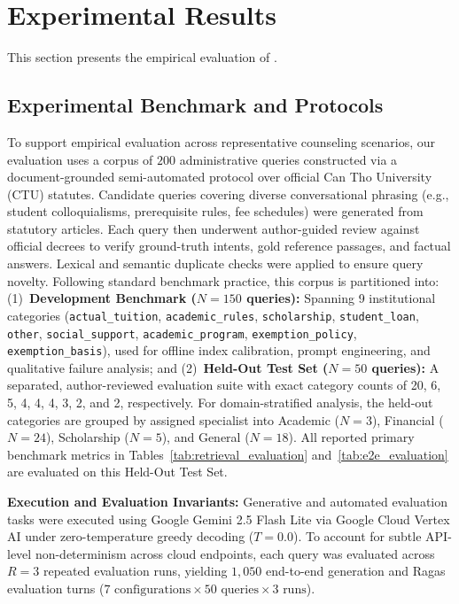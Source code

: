 \section{Experimental Results}
\label{sec:exp}

This section presents the empirical evaluation of \system{}.

\subsection{Experimental Benchmark and Protocols}
\label{sec:dataset}

To support empirical evaluation across representative counseling scenarios, our evaluation uses a corpus of $200$ administrative queries constructed via a document-grounded semi-automated protocol over official Can Tho University (CTU) statutes. Candidate queries covering diverse conversational phrasing (e.g., student colloquialisms, prerequisite rules, fee schedules) were generated from statutory articles. Each query then underwent author-guided review against official decrees to verify ground-truth intents, gold reference passages, and factual answers. Lexical and semantic duplicate checks were applied to ensure query novelty. Following standard benchmark practice, this corpus is partitioned into: (1)~\textbf{Development Benchmark ($N=150$ queries):} Spanning 9 institutional categories (\texttt{actual\_tuition}, \texttt{academic\_rules}, \texttt{scholarship}, \texttt{student\_loan}, \texttt{other}, \texttt{social\_support}, \texttt{academic\_program}, \texttt{exemption\_policy}, \texttt{exemption\_basis}), used for offline index calibration, prompt engineering, and qualitative failure analysis; and (2)~\textbf{Held-Out Test Set ($N=50$ queries):} A separated, author-reviewed evaluation suite with exact category counts of 20, 6, 5, 4, 4, 4, 3, 2, and 2, respectively. For domain-stratified analysis, the held-out categories are grouped by assigned specialist into Academic ($N=3$), Financial ($N=24$), Scholarship ($N=5$), and General ($N=18$). All reported primary benchmark metrics in Tables~\ref{tab:retrieval_evaluation} and~\ref{tab:e2e_evaluation} are evaluated on this Held-Out Test Set.

\noindent\textbf{Execution and Evaluation Invariants:} Generative and automated evaluation tasks were executed using Google Gemini 2.5 Flash Lite via Google Cloud Vertex AI under zero-temperature greedy decoding ($T=0.0$). To account for subtle API-level non-determinism across cloud endpoints, each query was evaluated across $R=3$ repeated evaluation runs, yielding $1,050$ end-to-end generation and Ragas evaluation turns ($7\text{ configurations} \times 50\text{ queries} \times 3\text{ runs}$).

